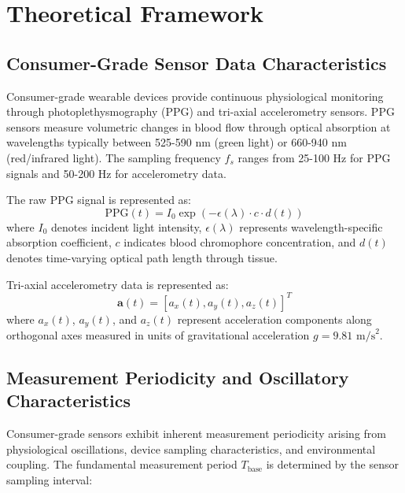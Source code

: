 \section{Theoretical Framework}

\subsection{Consumer-Grade Sensor Data Characteristics}

Consumer-grade wearable devices provide continuous physiological monitoring through photoplethysmography (PPG) and tri-axial accelerometry sensors. PPG sensors measure volumetric changes in blood flow through optical absorption at wavelengths typically between 525-590 nm (green light) or 660-940 nm (red/infrared light). The sampling frequency $f_s$ ranges from 25-100 Hz for PPG signals and 50-200 Hz for accelerometry data.

\begin{definition}
The raw PPG signal is represented as:
\begin{equation}
\text{PPG}(t) = I_0 \exp(-\epsilon(\lambda) \cdot c \cdot d(t))
\end{equation}
where $I_0$ denotes incident light intensity, $\epsilon(\lambda)$ represents wavelength-specific absorption coefficient, $c$ indicates blood chromophore concentration, and $d(t)$ denotes time-varying optical path length through tissue.
\end{definition}

\begin{definition}
Tri-axial accelerometry data is represented as:
\begin{equation}
\mathbf{a}(t) = [a_x(t), a_y(t), a_z(t)]^T
\end{equation}
where $a_x(t)$, $a_y(t)$, and $a_z(t)$ represent acceleration components along orthogonal axes measured in units of gravitational acceleration $g = 9.81 \text{ m/s}^2$.
\end{definition}

\subsection{Measurement Periodicity and Oscillatory Characteristics}

Consumer-grade sensors exhibit inherent measurement periodicity arising from physiological oscillations, device sampling characteristics, and environmental coupling. The fundamental measurement period $T_{\text{base}}$ is determined by the sensor sampling interval:

